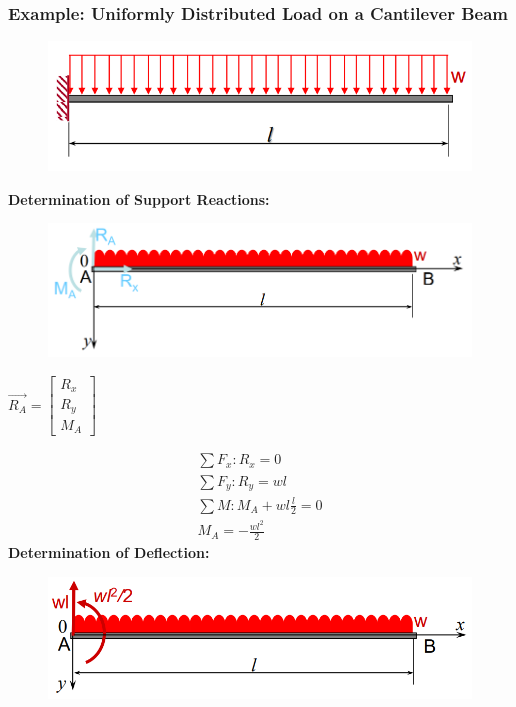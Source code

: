 \documentclass[class=report, crop=false, 12pt,a4paper]{standalone}
\begin{document}
\subsubsection{Example: Uniformly Distributed Load on a Cantilever Beam}
\begin{figure}[H]
  \centering
  \includegraphics[width = 0.8 \textwidth]{../img/beam3.PNG}
\end{figure}
\textbf{Determination of Support Reactions:}
\begin{figure}[H]
  \centering
  \includegraphics[width = 0.8 \textwidth]{../img/beam4.PNG}
\end{figure}
\begin{center}
  $\vec{R_A} = \left[ \begin{array}{ccc} R_x \\ R_y \\ M_A \end{array}\right]$
\end{center}
\begin{gather}
  \sum F_x: R_x = 0 \\
  \sum F_y: R_y = wl \\
  \sum M: M_A + wl\frac{l}{2} = 0 \\
  M_A = -\frac{wl^2}{2}
\end{gather}
\textbf{Determination of Deflection:}
\begin{figure}[H]
  \centering
  \includegraphics[width = 0.8 \textwidth]{../img/beam5.PNG}
\end{figure}
\end{document}
